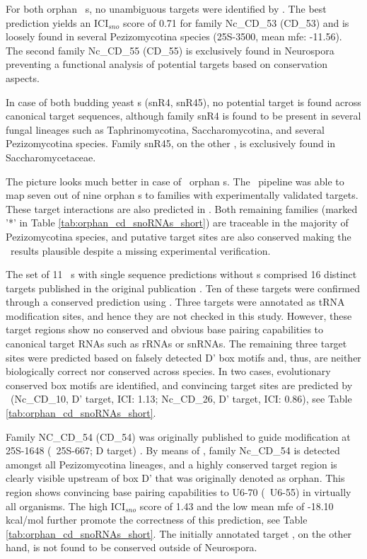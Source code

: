 For both orphan \ncr\ \sno s, no unambiguous targets were identified by
\snostrip. The best prediction yields an ICI$_{sno}$ score of 0.71 for
family Nc\_CD\_53 (CD\_53) and is loosely found in several
Pezizomycotina species (25S-3500, mean mfe: -11.56). The second family
Nc\_CD\_55 (CD\_55) is exclusively found in Neurospora preventing a
functional analysis of potential targets based on conservation
aspects.

In case of both budding yeast \sno s (snR4, snR45), no potential target is
found across canonical target sequences, although family snR4 is found to
be present in several fungal lineages such as Taphrinomycotina,
Saccharomycotina, and several Pezizomycotina species. Family snR45, on the
other , is exclusively found in Saccharomycetaceae.

The picture looks much better in case of \afu\ orphan \sno s. The
\snostrip\ pipeline was able to map seven out of nine orphan \cd s to
families with experimentally validated targets. These target interactions
are also predicted in \afu. Both remaining families (marked  '*' in
Table \ref{tab:orphan_cd_snoRNAs_short}) are traceable in the majority of
Pezizomycotina species, and putative target sites are also conserved making
the \snostrip\ results plausible despite a missing experimental
verification.

The set of 11 \ncr\ \sno s with single sequence predictions without
 \sno s comprised 16 distinct targets
published in the original publication \cite{Li:2005}.  Ten of these targets
were confirmed through a conserved prediction using \snostrip.  Three
targets were annotated as tRNA modification sites, and hence they are not
checked in this study. However, these target regions show no conserved and
obvious base pairing capabilities to canonical target RNAs such as rRNAs or
snRNAs. The remaining three target sites were predicted based on falsely
detected D' box motifs and, thus, are neither biologically correct nor
conserved across species. In two cases, evolutionary conserved box motifs
are identified, and convincing target sites are predicted by \snostrip\
(Nc\_CD\_10, D' target, ICI: 1.13; Nc\_CD\_26, D' target, ICI: 0.86), see
Table \ref{tab:orphan_cd_snoRNAs_short}.

Family NC\_CD\_54 (CD\_54) was originally published to guide modification
at 25S-1648 (\ncr\ 25S-667; D target) \cite{Liu:2009}. By means of
\snostrip, family Nc\_CD\_54 is detected amongst all Pezizomycotina
lineages, and a highly conserved target region is clearly visible upstream
of box D' that was originally denoted as orphan. This region shows
convincing base pairing capabilities to U6-70 (\ncr\ U6-55) in virtually
all organisms. The high ICI$_{sno}$ score of 1.43 and
the low mean mfe of -18.10 kcal/mol further promote the correctness of this
prediction, see Table \ref{tab:orphan_cd_snoRNAs_short}. The initially
annotated target \PFS{for box D}, on the other hand, is not found to be
conserved outside of Neurospora.

